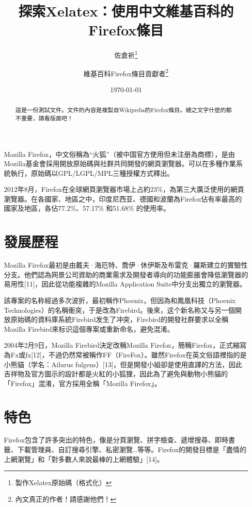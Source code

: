 \documentclass[12pt, a4paper]{article}
\begin{document}
\title{探索Xelatex：使用中文維基百科的Firefox條目}
\author{佐倉祈\thanks{製作Xelatex原始碼（格式化）}
  \and 維基百科Firefox條目貢獻者\thanks{內文真正的作者！請感謝他們！}}
\date{\today}
\maketitle

\begin{abstract}
這是一份測試文件。文件的內容是複製自Wikipedia的Firefox條目。總之文字什麼的都不重要，請看版面吧！
\end{abstract}

Mozilla Firefox，中文俗稱為“火狐”（被中国官方使用但未注册為商標），是由Mozilla基金會採用開放原始碼與社群共同開發的網頁瀏覽器。可以在多種作業系統執行，原始碼以GPL/LGPL/MPL三種授權方式釋出。

2012年8月，Firefox在全球網頁瀏覽器市場上占約23\%，為第三大廣泛使用的網頁瀏覽器。在各國家、地區之中，印度尼西亚、德國和波蘭為Firefox佔有率最高的國家及地區，各佔77.2\%、57.17\% 和51.68\% 的使用率。

\section{發展歷程}
Mozilla Firefox最初是由戴夫·海厄特、喬伊·休伊斯及布雷克·羅斯建立的實驗性分支。他們認為网景公司資助的商業需求及開發者導向的功能膨脹會降低瀏覽器的易用性[11]，因此從功能複雜的Mozilla Application Suite中分支出獨立的瀏覽器。

該專案的名称經過多次波折，最初稱作Phoenix，但因為和鳳凰科技（Phoenix Technologies）的名稱衝突，于是改為Firebird。後來，这个新名称又与另一個開放原始碼的資料庫系統Firebird发生了冲突，Firebird的開發社群要求以全稱Mozilla Firebird來标识這個專案或重新命名，避免混淆。

2004年2月9日，Mozilla Firebird決定改稱Mozilla Firefox，簡稱Firefox，正式縮寫為Fx或fx[12]，不過仍然常被稱作FF（FireFox）。雖然Firefox在英文俗語裡指的是小熊貓（学名：Ailurus fulgens）[13]，但是開發小組卻是使用直譯的方法，因此吉祥物及官方圖示的設計都是火紅的小狐狸，因此為了避免與動物小熊貓的「Firefox」混淆，官方採用全稱「Mozilla Firefox」。

\section{特色}

Firefox包含了許多突出的特色，像是分頁瀏覽、拼字檢查、遞增搜尋、即時書籤、下載管理員、自訂搜尋引擎、私密瀏覽…等等。Firefox的開發目標是「盡情的上網瀏覽」和「對多數人來說最棒的上網體驗」[14]。
\end{document}
